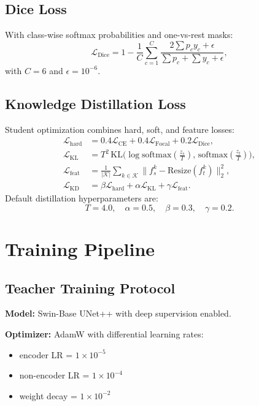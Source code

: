 \documentclass[journal]{IEEEtran}
\begin{document}
\subsection{Dice Loss}
With class-wise softmax probabilities and one-vs-rest masks:
\begin{equation}
\mathcal{L}_{\text{Dice}}=1-\frac{1}{C}\sum_{c=1}^{C}
\frac{2\sum p_c y_c + \epsilon}{\sum p_c + \sum y_c + \epsilon},
\end{equation}
with $C=6$ and $\epsilon=10^{-6}$.

\subsection{Knowledge Distillation Loss}
Student optimization combines hard, soft, and feature losses:
\begin{align}
\mathcal{L}_{\text{hard}} &= 0.4\mathcal{L}_{\text{CE}} + 0.4\mathcal{L}_{\text{Focal}} + 0.2\mathcal{L}_{\text{Dice}}, \\
\mathcal{L}_{\text{KL}} &= T^2\,\mathrm{KL}\Big(\log\mathrm{softmax}(\tfrac{z_s}{T}),\,\mathrm{softmax}(\tfrac{z_t}{T})\Big), \\
\mathcal{L}_{\text{feat}} &= \frac{1}{|\mathcal{K}|}\sum_{k\in\mathcal{K}}\|f_s^k - \mathrm{Resize}(f_t^k)\|_2^2, \\
\mathcal{L}_{\text{KD}} &= \beta\mathcal{L}_{\text{hard}} + \alpha\mathcal{L}_{\text{KL}} + \gamma\mathcal{L}_{\text{feat}}.
\end{align}
Default distillation hyperparameters are:
\begin{equation}
T=4.0,\quad \alpha=0.5,\quad \beta=0.3,\quad \gamma=0.2.
\end{equation}

\section{Training Pipeline}
\subsection{Teacher Training Protocol}
\textbf{Model:} Swin-Base UNet++ with deep supervision enabled.

\textbf{Optimizer:} AdamW with differential learning rates:
\begin{itemize}
    \item encoder LR = $1\times10^{-5}$
    \item non-encoder LR = $1\times10^{-4}$
    \item weight decay = $1\times10^{-2}$
\end{itemize}
\end{document}
